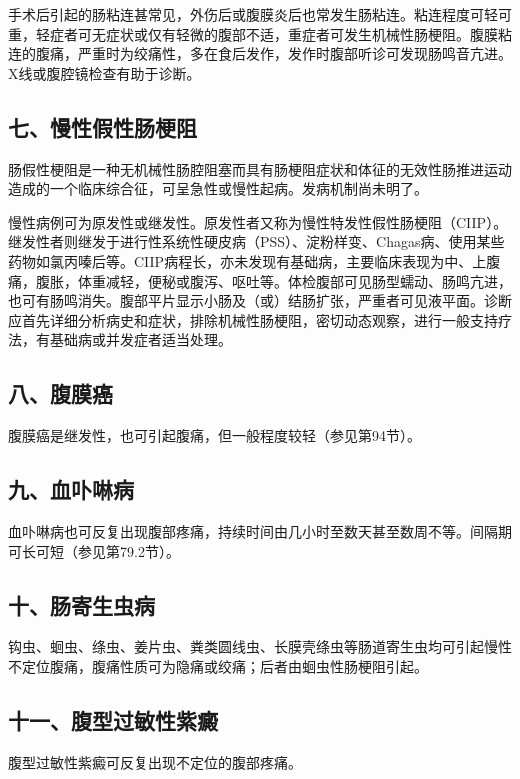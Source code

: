 手术后引起的肠粘连甚常见，外伤后或腹膜炎后也常发生肠粘连。粘连程度可轻可重，轻症者可无症状或仅有轻微的腹部不适，重症者可发生机械性肠梗阻。腹膜粘连的腹痛，严重时为绞痛性，多在食后发作，发作时腹部听诊可发现肠鸣音亢进。X线或腹腔镜检查有助于诊断。

\subsection{七、慢性假性肠梗阻}

肠假性梗阻是一种无机械性肠腔阻塞而具有肠梗阻症状和体征的无效性肠推进运动造成的一个临床综合征，可呈急性或慢性起病。发病机制尚未明了。

慢性病例可为原发性或继发性。原发性者又称为慢性特发性假性肠梗阻（CIIP）。继发性者则继发于进行性系统性硬皮病（PSS）、淀粉样变、Chagas病、使用某些药物如氯丙嗪后等。CIIP病程长，亦未发现有基础病，主要临床表现为中、上腹痛，腹胀，体重减轻，便秘或腹泻、呕吐等。体检腹部可见肠型蠕动、肠鸣亢进，也可有肠鸣消失。腹部平片显示小肠及（或）结肠扩张，严重者可见液平面。诊断应首先详细分析病史和症状，排除机械性肠梗阻，密切动态观察，进行一般支持疗法，有基础病或并发症者适当处理。

\subsection{八、腹膜癌}

腹膜癌是继发性，也可引起腹痛，但一般程度较轻（参见第94节）。

\subsection{九、血卟啉病}

血卟啉病也可反复出现腹部疼痛，持续时间由几小时至数天甚至数周不等。间隔期可长可短（参见第79.2节）。

\subsection{十、肠寄生虫病}

钩虫、蛔虫、绦虫、姜片虫、粪类圆线虫、长膜壳绦虫等肠道寄生虫均可引起慢性不定位腹痛，腹痛性质可为隐痛或绞痛；后者由蛔虫性肠梗阻引起。

\subsection{十一、腹型过敏性紫癜}

腹型过敏性紫癜可反复出现不定位的腹部疼痛。


